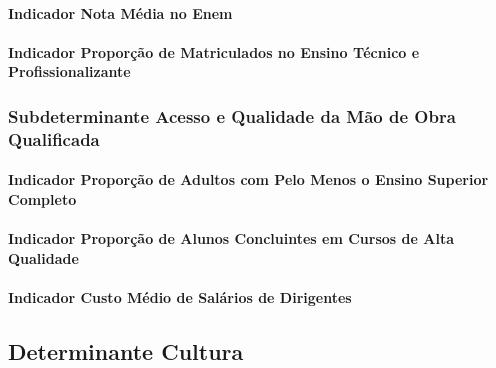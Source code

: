 \documentclass[
  12,
  dvipsnames]{article}
\begin{document}
\hypertarget{indicador-nota-muxe9dia-no-enem}{%
\paragraph{Indicador Nota Média no
Enem}\label{indicador-nota-muxe9dia-no-enem}}

\hypertarget{indicador-proporuxe7uxe3o-de-matriculados-no-ensino-tuxe9cnico-e-profissionalizante}{%
\paragraph{Indicador Proporção de Matriculados no Ensino Técnico e
Profissionalizante}\label{indicador-proporuxe7uxe3o-de-matriculados-no-ensino-tuxe9cnico-e-profissionalizante}}

\hypertarget{subdet_obra_qualificada}{%
\subsubsection{Subdeterminante Acesso e Qualidade da Mão de Obra
Qualificada}\label{subdet_obra_qualificada}}

\hypertarget{indicador-proporuxe7uxe3o-de-adultos-com-pelo-menos-o-ensino-superior-completo}{%
\paragraph{Indicador Proporção de Adultos com Pelo Menos o Ensino
Superior
Completo}\label{indicador-proporuxe7uxe3o-de-adultos-com-pelo-menos-o-ensino-superior-completo}}

\hypertarget{indicador-proporuxe7uxe3o-de-alunos-concluintes-em-cursos-de-alta-qualidade}{%
\paragraph{Indicador Proporção de Alunos Concluintes em Cursos de Alta
Qualidade}\label{indicador-proporuxe7uxe3o-de-alunos-concluintes-em-cursos-de-alta-qualidade}}

\hypertarget{indicador-custo-muxe9dio-de-saluxe1rios-de-dirigentes}{%
\paragraph{Indicador Custo Médio de Salários de
Dirigentes}\label{indicador-custo-muxe9dio-de-saluxe1rios-de-dirigentes}}

\hypertarget{determinante-cultura}{%
\subsection{Determinante Cultura}\label{determinante-cultura}}
\end{document}
